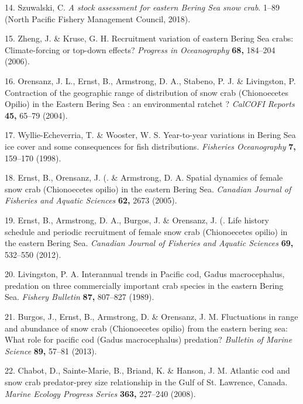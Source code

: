 \documentclass[11pt,]{article}
\begin{document}
\leavevmode\hypertarget{ref-NPFMC2018}{}%
14. Szuwalski, C. \emph{A stock assessment for eastern Bering Sea snow crab}. 1--89 (North Pacific Fishery Management Council, 2018).

\leavevmode\hypertarget{ref-Zheng2006}{}%
15. Zheng, J. \& Kruse, G. H. Recruitment variation of eastern Bering Sea crabs: Climate-forcing or top-down effects? \emph{Progress in Oceanography} \textbf{68,} 184--204 (2006).

\leavevmode\hypertarget{ref-Orensanz2004}{}%
16. Orensanz, J. L., Ernst, B., Armstrong, D. A., Stabeno, P. J. \& Livingston, P. Contraction of the geographic range of distribution of snow crab (Chionoecetes Opilio) in the Eastern Bering Sea : an environmental ratchet ? \emph{CalCOFI Reports} \textbf{45,} 65--79 (2004).

\leavevmode\hypertarget{ref-Wyllie-Echeverria1998}{}%
17. Wyllie-Echeverria, T. \& Wooster, W. S. Year-to-year variations in Bering Sea ice cover and some consequences for fish distributions. \emph{Fisheries Oceanography} \textbf{7,} 159--170 (1998).

\leavevmode\hypertarget{ref-Ernst2005}{}%
18. Ernst, B., Orensanz, J. (. \& Armstrong, D. A. Spatial dynamics of female snow crab (Chionoecetes opilio) in the eastern Bering Sea. \emph{Canadian Journal of Fisheries and Aquatic Sciences} \textbf{62,} 2673 (2005).

\leavevmode\hypertarget{ref-Ernst2012}{}%
19. Ernst, B., Armstrong, D. A., Burgos, J. \& Orensanz, J. (. Life history schedule and periodic recruitment of female snow crab (Chionoecetes opilio) in the eastern Bering Sea. \emph{Canadian Journal of Fisheries and Aquatic Sciences} \textbf{69,} 532--550 (2012).

\leavevmode\hypertarget{ref-Livingston1989}{}%
20. Livingston, P. A. Interannual trends in Pacific cod, Gadus macrocephalus, predation on three commercially important crab species in the eastern Bering Sea. \emph{Fishery Bulletin} \textbf{87,} 807--827 (1989).

\leavevmode\hypertarget{ref-Burgos2013}{}%
21. Burgos, J., Ernst, B., Armstrong, D. \& Orensanz, J. M. Fluctuations in range and abundance of snow crab (Chionoecetes opilio) from the eastern bering sea: What role for pacific cod (Gadus macrocephalus) predation? \emph{Bulletin of Marine Science} \textbf{89,} 57--81 (2013).

\leavevmode\hypertarget{ref-Chabot2008}{}%
22. Chabot, D., Sainte-Marie, B., Briand, K. \& Hanson, J. M. Atlantic cod and snow crab predator-prey size relationship in the Gulf of St. Lawrence, Canada. \emph{Marine Ecology Progress Series} \textbf{363,} 227--240 (2008).
\end{document}
